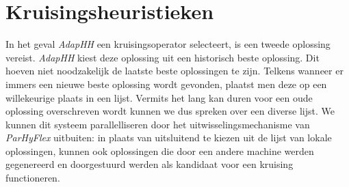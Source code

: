 \section{Kruisingsheuristieken}

In het geval \emph{AdapHH} een kruisingsoperator selecteert, is een tweede oplossing vereist. \emph{AdapHH} kiest deze oplossing uit een historisch beste oplossing. Dit hoeven niet noodzakelijk de laatste beste oplossingen te zijn. Telkens wanneer er immers een nieuwe beste oplossing wordt gevonden, plaatst men deze op een willekeurige plaats in een lijst. Vermits het lang kan duren voor een oude oplossing overschreven wordt kunnen we dus spreken over een diverse lijst. We kunnen dit systeem parallelliseren door het uitwisselingsmechanisme van \emph{ParHyFlex} uitbuiten: in plaats van uitsluitend te kiezen uit de lijst van lokale oplossingen, kunnen ook oplossingen die door een andere machine werden gegenereerd en doorgestuurd werden als kandidaat voor een kruising functioneren.